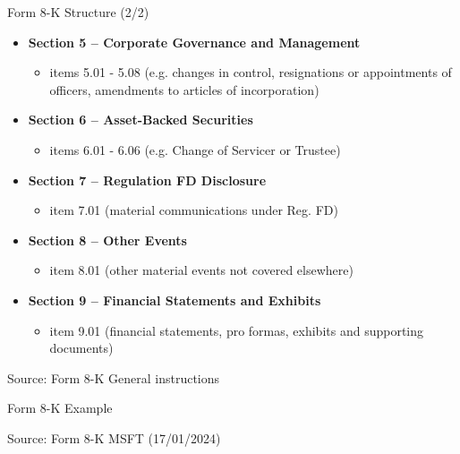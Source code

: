 \documentclass{beamer}
\begin{document}
\begin{frame}{Form 8-K Structure (2/2)}
\begin{itemize}
\item \textbf{Section 5 – Corporate Governance and Management}
\begin{itemize}
\item items 5.01 - 5.08 (e.g. changes in control, resignations or appointments of officers, amendments to articles of incorporation)
\end{itemize}
\item \textbf{Section 6 – Asset-Backed Securities}
\begin{itemize}
\item items 6.01 - 6.06 (e.g. Change of Servicer or Trustee)
\end{itemize}
\item \textbf{Section 7 – Regulation FD Disclosure}
\begin{itemize}
\item item 7.01 (material communications under Reg. FD)
\end{itemize}
\item \textbf{Section 8 – Other Events}
\begin{itemize}
\item item 8.01 (other material events not covered elsewhere)
\end{itemize}
\item \textbf{Section 9 – Financial Statements and Exhibits}
\begin{itemize}
\item item 9.01 (financial statements, pro formas, exhibits and supporting documents)
\end{itemize}
\end{itemize}

\vspace{0.5cm}
\footnotesize{Source: Form 8-K General instructions}
\end{frame}

\begin{frame}{Form 8-K Example}
\vspace{2cm}
\begin{center}
\footnotesize{Source: Form 8-K MSFT (17/01/2024)}
\end{center}
\end{frame}
\end{document}
